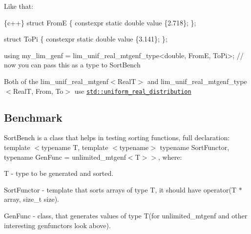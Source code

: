 Like that\+: 
\begin{DoxyCode}
\{c++\}
struct FromE \{
    constexpr static double value \{2.718\};
\};

struct ToPi \{
    constexpr static double value \{3.141\};
\};

using my\_lim\_genf = lim\_unif\_real\_mtgenf\_type<double, FromE, ToPi>;
// now you can pass this as a type to SortBench
\end{DoxyCode}
 Both of the {\ttfamily lim\+\_\+unif\+\_\+real\+\_\+mtgenf$<$RealT$>$} and {\ttfamily lim\+\_\+unif\+\_\+real\+\_\+mtgenf\+\_\+type$<$RealT, From, To$>$} use \href{https://en.cppreference.com/w/cpp/numeric/random/uniform_real_distribution}{\tt {\ttfamily std\+::uniform\+\_\+real\+\_\+distribution}}

\subsection*{Benchmark}

{\ttfamily Sort\+Bench} is a class that helps in testing sorting functions, full declaration\+: {\ttfamily template $<$typename T, template $<$typename$>$ typename Sort\+Functor, typename Gen\+Func = unlimited\+\_\+mtgenf$<$T$>$$>$}, where\+:
\begin{DoxyItemize}
\item {\ttfamily T} -\/ type to be generated and sorted.
\item {\ttfamily Sort\+Functor} -\/ template that sorts arrays of type {\ttfamily T}, it should have {\ttfamily operator(\+T $\ast$ array, size\+\_\+t size)}.
\item {\ttfamily Gen\+Func} -\/ class, that generates values of type {\ttfamily T}(for {\ttfamily unlimited\+\_\+mtgenf} and other interesting genfunctors look above).
\end{DoxyItemize}

